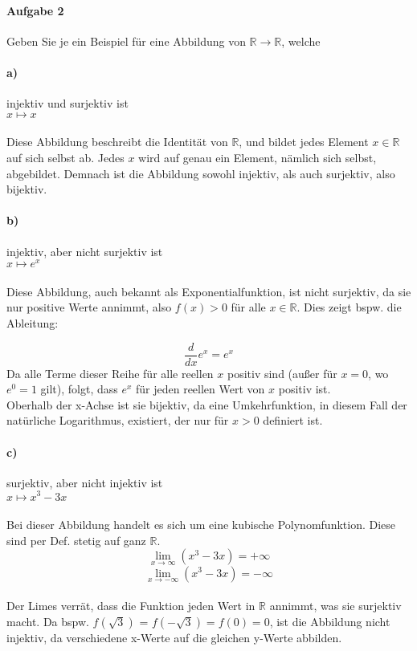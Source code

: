 \documentclass[12pt, letterpaper]{article}
\begin{document}
\paragraph{Aufgabe 2}

Geben Sie je ein Beispiel für eine Abbildung von $\mathbb{R} \to \mathbb{R}$, welche

\paragraph{a)}

injektiv und surjektiv ist\\

\noindent $x \mapsto x$\\ \\
\noindent Diese Abbildung beschreibt die Identität von $\mathbb{R}$, und bildet jedes Element $x \in \mathbb{R}$ auf sich selbst ab. Jedes $x$ wird auf genau ein Element, nämlich sich selbst, abgebildet. Demnach ist die Abbildung sowohl injektiv, als auch surjektiv, also bijektiv.

\paragraph{b)}
\noindent injektiv, aber nicht surjektiv ist\\

\noindent $x \mapsto e^x$\\ \\
\noindent Diese Abbildung, auch bekannt als Exponentialfunktion, ist nicht surjektiv, da sie nur positive Werte annimmt, also $f(x) > 0$ für alle $x \in \mathbb{R}$. Dies zeigt bspw. die Ableitung: 

\[
\frac{d}{dx} e^x = e^x
\]
\noindent Da alle Terme dieser Reihe für alle reellen $x$ positiv sind (außer für $x = 0$, wo $e^0 = 1$ gilt), folgt, dass $e^x$ für jeden reellen Wert von $x$ positiv ist.\\

\noindent Oberhalb der x-Achse ist sie bijektiv, da eine Umkehrfunktion, in diesem Fall der natürliche Logarithmus, existiert, der nur für $x > 0$ definiert ist.

\paragraph{c)}
\noindent surjektiv, aber nicht injektiv ist\\

\noindent $x \mapsto x^3-3x$\\ \\
\noindent Bei dieser Abbildung handelt es sich um eine kubische Polynomfunktion. Diese sind per Def. stetig auf ganz $\mathbb{R}$.\\
$$ \lim_{x\to\infty} (x^3-3x) = + \infty $$
$$ \lim_{x\to-\infty} (x^3-3x) = - \infty $$\\
\noindent Der Limes verrät, dass die Funktion jeden Wert in $\mathbb{R}$ annimmt, was sie surjektiv macht.
\noindent Da bspw. $f(\sqrt{3})$ = $f(-\sqrt{3}) = f(0) = 0$, ist die Abbildung nicht injektiv, da verschiedene x-Werte auf die gleichen y-Werte abbilden.
\end{document}
